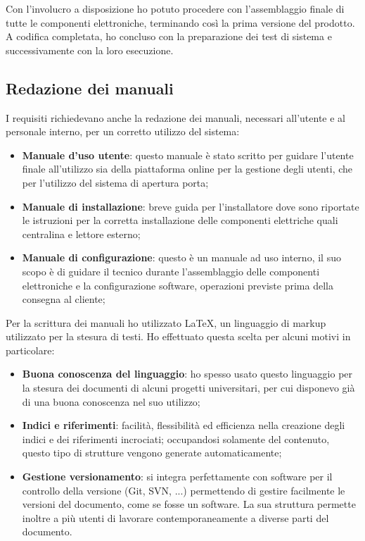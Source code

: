 Con l'involucro a disposizione ho potuto procedere con l'assemblaggio finale di tutte le componenti elettroniche, terminando così la prima versione del prodotto. A codifica completata, ho concluso con la preparazione dei test di sistema e successivamente con la loro esecuzione.

\subsection{Redazione dei manuali}
I requisiti richiedevano anche la redazione dei manuali, necessari all'utente e al personale interno, per un corretto utilizzo del sistema:
\begin{itemize}
\item \textbf{Manuale d'uso utente}: questo manuale è stato scritto per guidare l'utente finale all'utilizzo sia della piattaforma online per la gestione degli utenti, che per l'utilizzo del sistema di apertura porta;
\item \textbf{Manuale di installazione}: breve guida per l'installatore dove sono riportate le istruzioni per la corretta installazione delle componenti elettriche quali centralina e lettore esterno;
\item \textbf{Manuale di configurazione}: questo è un manuale ad uso interno, il suo scopo è di guidare il tecnico durante l'assemblaggio delle componenti elettroniche e la configurazione software, operazioni previste prima della consegna al cliente;
\end{itemize}

Per la scrittura dei manuali ho utilizzato \LaTeX, un linguaggio di markup utilizzato per la stesura di testi.
Ho effettuato questa scelta per alcuni motivi in particolare:
\begin{itemize}
\item \textbf{Buona conoscenza del linguaggio}: ho spesso usato questo linguaggio per la stesura dei documenti di alcuni progetti universitari, per cui disponevo già di una buona conoscenza nel suo utilizzo;
\item \textbf{Indici e riferimenti}: facilità, flessibilità ed efficienza nella creazione degli indici e dei riferimenti incrociati; occupandosi solamente del contenuto, questo tipo di strutture vengono generate automaticamente;
\item \textbf{Gestione versionamento}: si integra perfettamente con software per il controllo della versione (Git, SVN, ...) permettendo di gestire facilmente le versioni del documento, come se fosse un software. La sua struttura permette inoltre a più utenti di lavorare contemporaneamente a diverse parti del documento.
\end{itemize}

